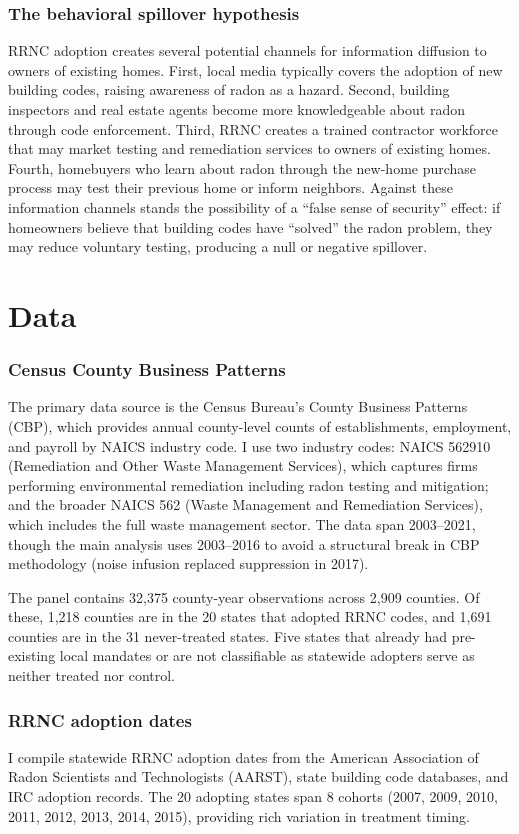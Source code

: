\documentclass[12pt]{article}
\begin{document}
\subsubsection*{The behavioral spillover hypothesis} RRNC adoption creates several potential channels for information diffusion to owners of existing homes. First, local media typically covers the adoption of new building codes, raising awareness of radon as a hazard. Second, building inspectors and real estate agents become more knowledgeable about radon through code enforcement. Third, RRNC creates a trained contractor workforce that may market testing and remediation services to owners of existing homes. Fourth, homebuyers who learn about radon through the new-home purchase process may test their previous home or inform neighbors. Against these information channels stands the possibility of a ``false sense of security'' effect: if homeowners believe that building codes have ``solved'' the radon problem, they may reduce voluntary testing, producing a null or negative spillover.

\section{Data}

\subsubsection*{Census County Business Patterns} The primary data source is the Census Bureau's County Business Patterns (CBP), which provides annual county-level counts of establishments, employment, and payroll by NAICS industry code. I use two industry codes: NAICS 562910 (Remediation and Other Waste Management Services), which captures firms performing environmental remediation including radon testing and mitigation; and the broader NAICS 562 (Waste Management and Remediation Services), which includes the full waste management sector. The data span 2003--2021, though the main analysis uses 2003--2016 to avoid a structural break in CBP methodology (noise infusion replaced suppression in 2017).

The panel contains 32,375 county-year observations across 2,909 counties. Of these, 1,218 counties are in the 20 states that adopted RRNC codes, and 1,691 counties are in the 31 never-treated states. Five states that already had pre-existing local mandates or are not classifiable as statewide adopters serve as neither treated nor control.

\subsubsection*{RRNC adoption dates} I compile statewide RRNC adoption dates from the American Association of Radon Scientists and Technologists (AARST), state building code databases, and IRC adoption records. The 20 adopting states span 8 cohorts (2007, 2009, 2010, 2011, 2012, 2013, 2014, 2015), providing rich variation in treatment timing.
\end{document}
